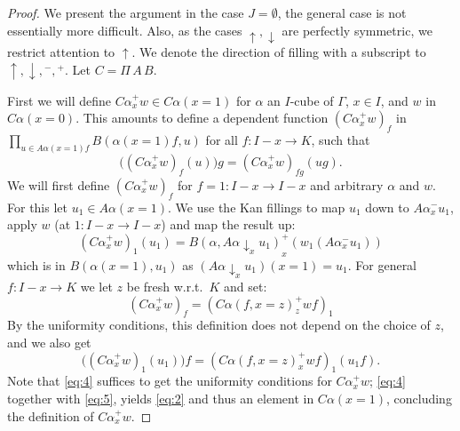\documentclass[10pt,a4paper]{article}
\newcommand{\es}{\emptyset}
\newcommand{\rup}[1]{#1{\uparrow}}
\newcommand{\rdo}[1]{#1{\downarrow}}
\begin{document}
\begin{proof}
  We present the argument in the case $J=\es$, the general case is not
  essentially more difficult.  Also, as the cases $\rup{},\rdo{}$ are
  perfectly symmetric, we restrict attention to $\rup{}$.  We denote
  the direction of filling with a subscript to $\rup{}, \rdo{}, {}^-,
  {}^+$.  Let $C = \Pi\,A\,B$.

  First we will define ${C \alpha}^+_x w \in C \alpha (x = 1)$ for
  $\alpha$ an $I$-cube of $\Gamma$, $x \in I$, and $w$ in $C \alpha (x
  = 0)$.  This amounts to define a dependent function $({C \alpha}^+_x
  w)_f$ in $\prod_{u \in A \alpha (x=1) f} B (\alpha (x=1) f, u)$ for
  all $f \colon I-x \to K$, such that
  \begin{equation}
    \label{eq:2}
    \bigl(({C \alpha}^+_x w)_f (u)\bigl) g = ({C \alpha}^+_x w)_{f g}
    (u g).
  \end{equation}
  We will first define $({C \alpha}^+_x w)_f$ for $f = 1 \colon I-x
  \to I-x$ and arbitrary $\alpha$ and $w$.  For this let $u_1 \in A
  \alpha (x=1)$.  We use the Kan fillings to map $u_1$ down to
  $A\alpha^-_xu_1$, apply $w$ (at $1 \colon I-x \to I-x$) and map the
  result up:
  \begin{equation}
    \label{eq:3}
    ({C \alpha}^+_x w)_1 (u_1) =
    B(\alpha,\rdo{A\alpha}_x u_1)^+_x (w_1 (A\alpha^-_x u_1))
  \end{equation}
  which is in $B (\alpha (x=1), u_1)$ as $(\rdo{A\alpha}_x u_1) (x=1)
  = u_1$.  For general $f \colon I-x \to K$ we let $z$ be fresh
  w.r.t.\ $K$ and set:
  \begin{equation}
    \label{eq:4}
    ({C \alpha}^+_x w)_f = ({C \alpha (f, x=z)}^+_z w f)_1
  \end{equation}
  By the uniformity conditions, this definition does not depend on the
  choice of $z$, and we also get
  \begin{equation}
    \label{eq:5}
    \bigl(({C \alpha}^+_x w)_1 (u_1)\bigr) f = ({C \alpha (f,x=z)}^+_x
    w f)_1 (u_1 f).
  \end{equation}
  Note that \eqref{eq:4} suffices to get the uniformity conditions for
  ${C \alpha}^+_x w$; \eqref{eq:4} together with \eqref{eq:5}, yields
  \eqref{eq:2} and thus an element in $C \alpha (x=1)$, concluding the
  definition of ${C \alpha}^+_x w$.


\end{proof}
\end{document}

